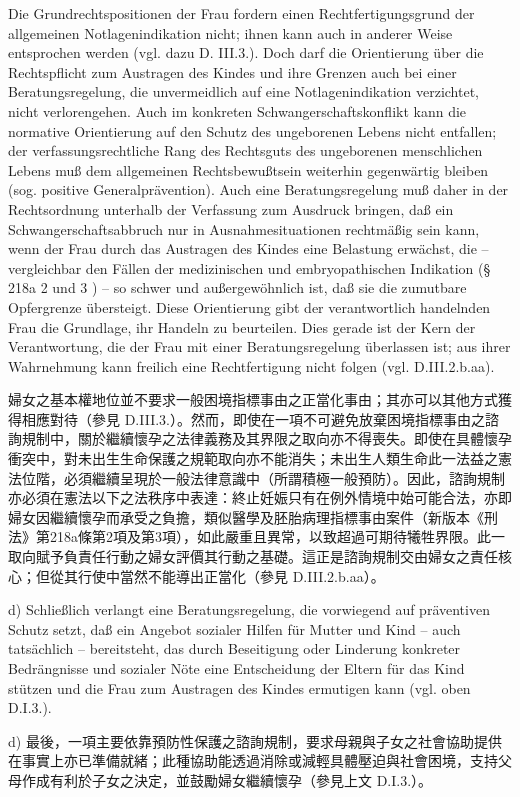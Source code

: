\documentclass[12pt]{article}
\begin{document}
\begin{sourcepara}[title={原文D.87}]
Die Grundrechtspositionen der Frau fordern einen Rechtfertigungsgrund der allgemeinen Notlagenindikation nicht; ihnen kann auch in anderer Weise entsprochen werden (vgl. dazu D. III.3.). Doch darf die Orientierung über die Rechtspflicht zum Austragen des Kindes und ihre Grenzen auch bei einer Beratungsregelung, die unvermeidlich auf eine Notlagenindikation verzichtet, nicht verlorengehen. Auch im konkreten Schwangerschaftskonflikt kann die normative Orientierung auf den Schutz des ungeborenen Lebens nicht entfallen; der verfassungsrechtliche Rang des Rechtsguts des ungeborenen menschlichen Lebens muß dem allgemeinen Rechtsbewußtsein weiterhin gegenwärtig bleiben (sog. positive Generalprävention). Auch eine Beratungsregelung muß daher in der Rechtsordnung unterhalb der Verfassung zum Ausdruck bringen, daß ein Schwangerschaftsabbruch nur in Ausnahmesituationen rechtmäßig sein kann, wenn der Frau durch das Austragen des Kindes eine Belastung erwächst, die -- vergleichbar den Fällen der medizinischen und embryopathischen Indikation (§ 218a \abbrAbs{} 2 und 3 \abbrStGB{} \abbrNF{}) -- so schwer und außergewöhnlich ist, daß sie die zumutbare Opfergrenze übersteigt. Diese Orientierung gibt der verantwortlich handelnden Frau die Grundlage, ihr Handeln zu beurteilen. Dies gerade ist der Kern der Verantwortung, die der Frau mit einer Beratungsregelung überlassen ist; aus ihrer Wahrnehmung kann freilich eine Rechtfertigung nicht folgen (vgl. D.III.2.b.aa).
\end{sourcepara}
\begin{transpara}
婦女之基本權地位並不要求一般困境指標事由之正當化事由；其亦可以其他方式獲得相應對待（參見 D.III.3.）。然而，即使在一項不可避免放棄困境指標事由之諮詢規制中，關於繼續懷孕之法律義務及其界限之取向亦不得喪失。即使在具體懷孕衝突中，對未出生生命保護之規範取向亦不能消失；未出生人類生命此一法益之憲法位階，必須繼續呈現於一般法律意識中（所謂積極一般預防）。因此，諮詢規制亦必須在憲法以下之法秩序中表達：終止妊娠只有在例外情境中始可能合法，亦即婦女因繼續懷孕而承受之負擔，類似醫學及胚胎病理指標事由案件（新版本《刑法》第218a條第2項及第3項），如此嚴重且異常，以致超過可期待犧牲界限。此一取向賦予負責任行動之婦女評價其行動之基礎。這正是諮詢規制交由婦女之責任核心；但從其行使中當然不能導出正當化（參見 D.III.2.b.aa）。
\end{transpara}

\begin{sourcepara}[title={原文D.88}]
d) Schließlich verlangt eine Beratungsregelung, die vorwiegend auf präventiven Schutz setzt, daß ein Angebot sozialer Hilfen für Mutter und Kind -- auch tatsächlich -- bereitsteht, das durch Beseitigung oder Linderung konkreter Bedrängnisse und sozialer Nöte eine Entscheidung der Eltern für das Kind stützen und die Frau zum Austragen des Kindes ermutigen kann (vgl. oben D.I.3.).
\end{sourcepara}
\begin{transpara}
d) 最後，一項主要依靠預防性保護之諮詢規制，要求母親與子女之社會協助提供在事實上亦已準備就緒；此種協助能透過消除或減輕具體壓迫與社會困境，支持父母作成有利於子女之決定，並鼓勵婦女繼續懷孕（參見上文 D.I.3.）。
\end{transpara}
\end{document}
